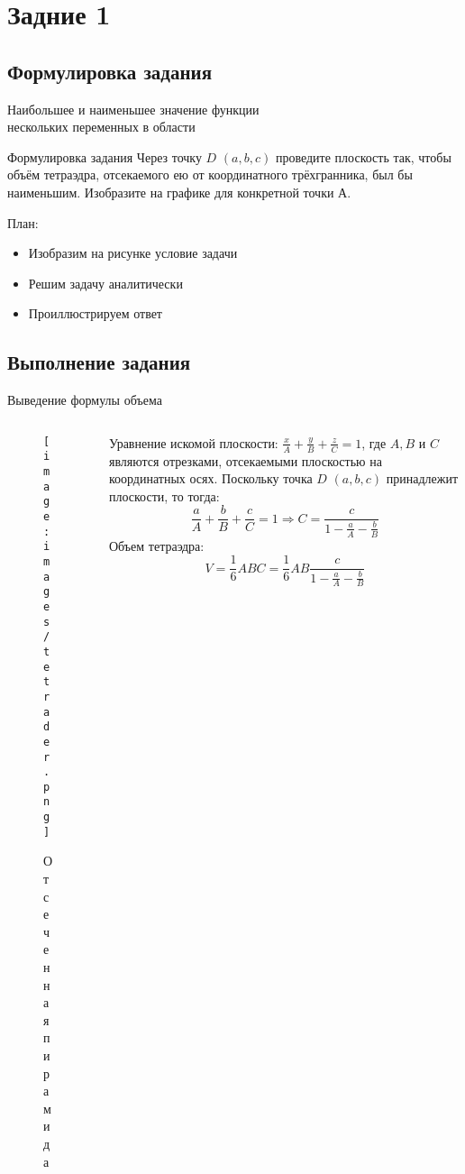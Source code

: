 \section{Задние 1}
\subsection{Формулировка задания}
\begin{frame}{Наибольшее и наименьшее значение функции\\
нескольких переменных в области} %

\begin{block}{Формулировка задания}
Через точку $D$ $(a,b,c)$ проведите плоскость так, чтобы объём тетраэдра, отсекаемого ею от
координатного трёхгранника, был бы наименьшим. Изобразите на графике для конкретной 
точки $А$.
\end{block}

\begin{block}{План:}
\begin{itemize}
    \item Изобразим на рисунке условие задачи
    \item Решим задачу аналитически
    \item Проиллюстрируем ответ
\end{itemize}
\end{block}
\end{frame}

\subsection{Выполнение задания}
\begin{frame}{Выведение формулы объема}
\begin{columns}[T]
    \begin{column}{0.48\textwidth}
    \begin{figure}
        \centering
        \texttt{[image: images/tetrader.png]}
        \caption{Отсеченная пирамида}
        \label{fig:pyramid}
    \end{figure}
    \end{column}
    \begin{column}{0.48\textwidth}
        Уравнение искомой плоскости: $\frac{x}{A}+\frac{y}{B}+\frac{z}{C}=1$, где $A, B$ и $C$ являются отрезками, отсекаемыми плоскостью на координатных осях. Поскольку точка $D$ $(a,b,c)$ принадлежит плоскости, то тогда: $$\frac{a}{A}+\frac{b}{B}+\frac{c}{C}=1 \Rightarrow C=\frac{c}{1-\frac{a}{A}-\frac{b}{B}}$$
        Объем тетраэдра: $$V=\frac{1}{6} A B C=\frac{1}{6} A B \frac{c}{1-\frac{a}{A}-\frac{b}{B}}$$
    \end{column}
\end{columns}
\end{frame}

